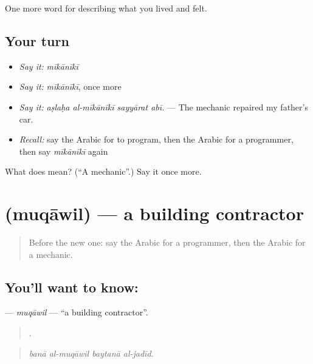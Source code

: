 \begin{grammarlens}[title={What you've built}]
One more word for describing what you lived and felt.
\end{grammarlens}

\subsection*{Your turn}
\begin{itemize}
\raggedright
  \item \emph{Say it:} \emph{mīkānīkī}
  \item \emph{Say it:} \emph{mīkānīkī}, once more
  \item \emph{Say it:} \emph{aṣlaḥa al-mīkānīkī sayyārat abī.} — The mechanic repaired my father's car.
  \item \emph{Recall:} say the Arabic for to program, then the Arabic for a programmer, then say \emph{mīkānīkī} again
\end{itemize}

\begin{tcolorbox}[breakable,colback=teal!4,colframe=teal!35!black,title={Before you move on}]
What does  mean? (\textquotedblleft{}A mechanic\textquotedblright{}.) Say it once more.
\end{tcolorbox}
\section[\texorpdfstring{\ar{مقاول} (muqāwil)}{مقاول (muqāwil)}]{ (muqāwil) — a building contractor}

\label{lesson:AR-C526-muqawil}



\begin{quote}
Before the new one: say the Arabic for a programmer, then the Arabic for a mechanic.
\end{quote}

\subsection*{You'll want to know: }
\textbf{} — \emph{muqāwil} — \textquotedblleft{}a building contractor\textquotedblright{}.

\begin{quote}
   .
\end{quote}

\begin{quote}
\emph{banā al-muqāwil baytanā al-jadīd.}
\end{quote}


